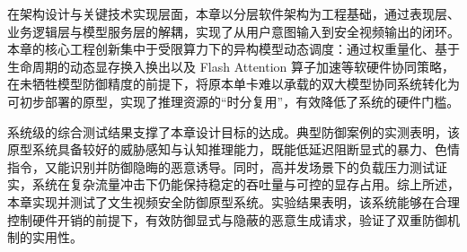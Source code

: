 在架构设计与关键技术实现层面，本章以分层软件架构为工程基础，通过表现层、业务逻辑层与模型服务层的解耦，实现了从用户意图输入到安全视频输出的闭环。本章的核心工程创新集中于受限算力下的异构模型动态调度：通过权重量化、基于生命周期的动态显存换入换出以及 Flash Attention 算子加速等软硬件协同策略，在未牺牲模型防御精度的前提下，将原本单卡难以承载的双大模型协同系统转化为可初步部署的原型，实现了推理资源的“时分复用”，有效降低了系统的硬件门槛。

系统级的综合测试结果支撑了本章设计目标的达成。典型防御案例的实测表明，该原型系统具备较好的威胁感知与认知推理能力，既能低延迟阻断显式的暴力、色情指令，又能识别并防御隐晦的恶意诱导。同时，高并发场景下的负载压力测试证实，系统在复杂流量冲击下仍能保持稳定的吞吐量与可控的显存占用。综上所述，本章实现并测试了文生视频安全防御原型系统。实验结果表明，该系统能够在合理控制硬件开销的前提下，有效防御显式与隐蔽的恶意生成请求，验证了双重防御机制的实用性。
